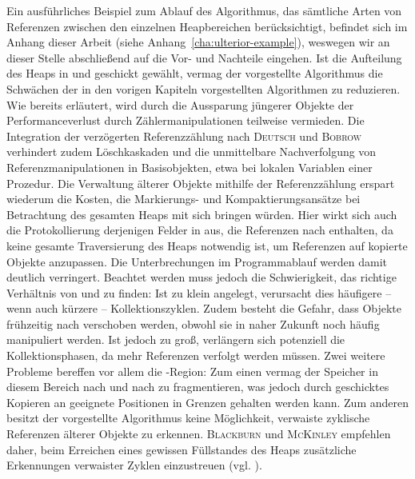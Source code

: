 Ein ausführliches Beispiel zum Ablauf des Algorithmus, das sämtliche Arten von Referenzen zwischen den einzelnen Heapbereichen berücksichtigt, befindet sich im Anhang dieser Arbeit (siehe Anhang~\ref{cha:ulterior-example}), weswegen wir an dieser Stelle abschließend auf die Vor- und Nachteile eingehen.
Ist die Aufteilung des Heaps in \Nursery und \Mature geschickt gewählt, vermag der vorgestellte Algorithmus die Schwächen der in den vorigen Kapiteln vorgestellten Algorithmen zu reduzieren.
Wie bereits erläutert, wird durch die Aussparung jüngerer Objekte der Performanceverlust durch Zählermanipulationen teilweise vermieden.
Die Integration der verzögerten Referenzzählung nach \textsc{Deutsch} und \textsc{Bobrow} verhindert zudem Löschkaskaden und die unmittelbare Nachverfolgung von Referenzmanipulationen in Basisobjekten, etwa bei lokalen Variablen einer Prozedur.
Die Verwaltung älterer Objekte mithilfe der Referenzzählung erspart wiederum die Kosten, die Markierungs- und Kompaktierungsansätze bei Betrachtung des gesamten Heaps mit sich bringen würden.
Hier wirkt sich auch die Protokollierung derjenigen Felder in \Mature aus, die Referenzen nach \Nursery enthalten, da keine gesamte Traversierung des Heaps notwendig ist, um Referenzen auf kopierte Objekte anzupassen.
Die Unterbrechungen im Programmablauf werden damit deutlich verringert.
Beachtet werden muss jedoch die Schwierigkeit, das richtige Verhältnis von \Nursery und \Mature zu finden:
Ist \Nursery zu klein angelegt, verursacht dies häufigere -- wenn auch kürzere -- Kollektionszyklen.
Zudem besteht die Gefahr, dass Objekte frühzeitig nach \Mature verschoben werden, obwohl sie in naher Zukunft noch häufig manipuliert werden.
Ist \Nursery jedoch zu groß, verlängern sich potenziell die Kollektionsphasen, da mehr Referenzen verfolgt werden müssen.
Zwei weitere Probleme bereffen vor allem die \Mature-Region:
Zum einen vermag der Speicher in diesem Bereich nach und nach zu fragmentieren, was jedoch durch geschicktes Kopieren an geeignete Positionen in Grenzen gehalten werden kann.
Zum anderen besitzt der vorgestellte Algorithmus keine Möglichkeit, verwaiste zyklische Referenzen älterer Objekte zu erkennen.
\textsc{Blackburn} und \textsc{McKinley} empfehlen daher, beim Erreichen eines gewissen Füllstandes des Heaps zusätzliche Erkennungen verwaister Zyklen einzustreuen (vgl. \cite[S. 349]{blackburn2003}).

